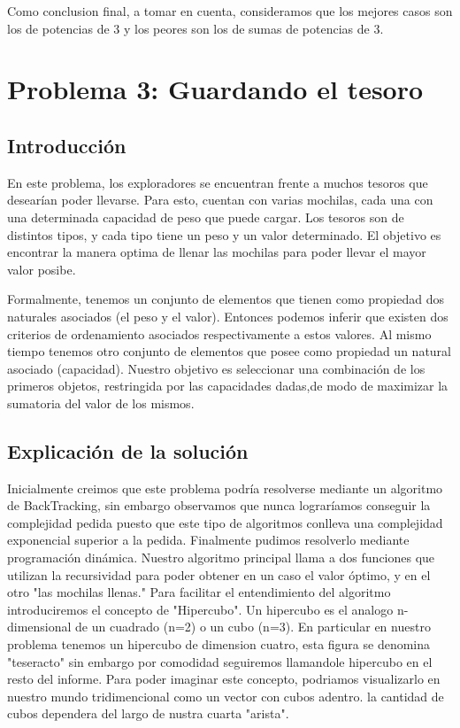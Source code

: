 \documentclass[spanish,12pt]{article}
\begin{document}
Como conclusion final, a tomar en cuenta, consideramos que los mejores casos son los de potencias de 3 y los peores son los de sumas de potencias de 3.






\section{Problema 3: Guardando el tesoro}

\subsection{Introducción}

En este problema, los exploradores se encuentran frente a muchos tesoros que desearían poder llevarse. Para esto, cuentan con varias mochilas, cada una con una determinada capacidad de peso que puede cargar.
Los tesoros son de distintos tipos, y cada tipo tiene un peso y un valor determinado.
El objetivo es encontrar la manera optima de llenar las mochilas para poder llevar el mayor valor posibe.

Formalmente, tenemos un conjunto de elementos que tienen como propiedad dos naturales asociados (el peso y el valor). Entonces podemos inferir que existen dos criterios de ordenamiento asociados respectivamente a estos valores.
Al mismo tiempo tenemos otro conjunto de elementos que posee como propiedad un natural asociado (capacidad).
Nuestro objetivo es seleccionar una combinación de los primeros objetos, restringida por las capacidades dadas,de modo de maximizar la sumatoria del valor de los mismos.


\subsection{Explicación de la solución}

   Inicialmente creimos que este problema podría resolverse mediante un algoritmo de BackTracking, sin embargo observamos que nunca lograríamos conseguir la complejidad pedida puesto que este tipo de algoritmos conlleva una complejidad exponencial superior a la pedida.
   Finalmente pudimos resolverlo mediante programación dinámica. Nuestro algoritmo principal llama a dos funciones que utilizan la recursividad para poder obtener en un caso el valor óptimo, y en el otro "las mochilas llenas."
   Para facilitar el entendimiento del algoritmo introduciremos el concepto de "Hipercubo". Un hipercubo es el analogo n-dimensional de un cuadrado (n=2) o un cubo (n=3). En particular en nuestro problema tenemos un hipercubo de dimension cuatro, esta figura se denomina "teseracto" sin embargo por comodidad seguiremos llamandole hipercubo en el resto del informe.
Para poder imaginar este concepto, podriamos visualizarlo en nuestro mundo tridimencional como un vector con cubos adentro. la cantidad de cubos dependera del largo de nustra cuarta "arista".
\end{document}
